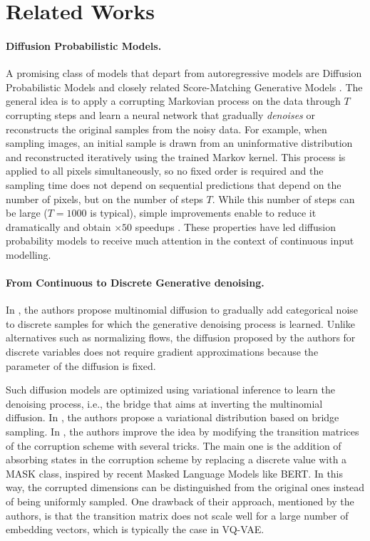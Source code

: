 \documentclass{article}
\theoremstyle{plain}
\theoremstyle{definition}
\theoremstyle{remark}
\begin{document}
\section{Related Works}

\paragraph{Diffusion Probabilistic Models.}
A promising class of models that depart from autoregressive models are Diffusion Probabilistic Models \cite{sohldickstein2015deep, ho2020denoising} and closely related Score-Matching Generative Models \cite{song2019generative, de2021simulating}. The general idea is to apply a corrupting Markovian process on the data through $T$ corrupting steps and learn a neural network that gradually \textit{denoises} or reconstructs the original samples from the noisy data.
For example, when sampling images, an initial sample is drawn from an uninformative distribution and reconstructed iteratively using the trained Markov kernel. This process is applied to all pixels simultaneously, so no fixed order is required and the sampling time does not depend on sequential predictions that depend on the number of pixels, but on the number of steps $T$. While this number of steps can be large ($T=1000$ is typical), simple improvements enable to reduce it dramatically and obtain $\times 50$ speedups \cite{song2021denoising}. These properties have led diffusion probability models to receive much attention in the context of continuous input modelling.


\paragraph{From Continuous to Discrete Generative denoising.}
In \cite{hoogeboom2021argmax}, the authors propose multinomial diffusion to gradually add categorical noise to discrete samples for which the generative denoising process is learned. Unlike alternatives such as normalizing flows, the diffusion proposed by the authors for discrete variables does not require gradient approximations because the parameter of the diffusion is fixed.

Such diffusion models are optimized using variational inference to learn the denoising process, i.e., the bridge that aims at inverting the multinomial diffusion. In \cite{hoogeboom2021argmax}, the authors propose a variational distribution based on bridge sampling.  
In \cite{austin2021structured}, the authors improve the idea by modifying the transition matrices of the corruption scheme with several tricks. The main one is the addition of absorbing states in the corruption scheme by replacing a discrete value with a MASK class, inspired by recent Masked Language Models like BERT. In this way, the corrupted dimensions can be distinguished from the original ones instead of being uniformly sampled. 
One drawback of their approach, mentioned by the authors, is that the transition matrix does not scale well for a large number of embedding vectors, which is typically the case in VQ-VAE.
\end{document}
